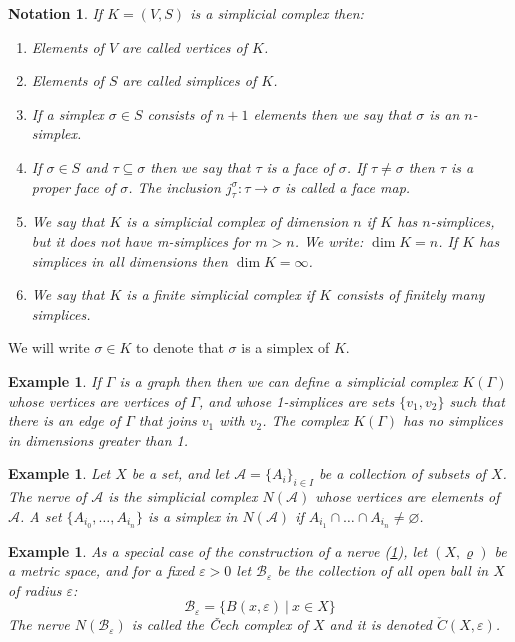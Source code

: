 \documentclass[11pt, letterpaper, oneside]{report}
\theoremstyle{pplain}
\newtheorem{ITERMVALUE THM}[theorem]{Intermediate Value Theorem}
\newtheorem{HEINEBOREL THM}[theorem]{Heine-Borel Theorem}
\newtheorem{UMETR THM}[theorem]{Urysohn Metrization Theorem}
\newtheorem{UMETR2 THM}[theorem]{Urysohn Metrization Theorem (v.2)}
\theoremstyle{ddefinition}
\newtheorem{example}[theorem]{Example}
\newtheorem{notation}[theorem]{Notation}
\theoremstyle{nnn}
\newtheorem{TDA NN}[theorem]{Topological Data Analysis. }
\theoremstyle{eexercise}
\newcommand{\benu}{\begin{enumerate}}
\newcommand{\eenu}{\end{enumerate}}
\begin{document}
\begin{notation}
If $K= (V, S)$ is a simplicial complex then:
\benu[leftmargin = *]
\item[\textbullet] Elements of $V$ are called \emph{vertices} of $K$.
\item[\textbullet] Elements of $S$ are called \emph{simplices} of $K$. 
\item[\textbullet] If  a simplex $\sigma\in S$ consists of $n+1$ elements then 
we say that $\sigma$ is  an \emph{$n$-simplex}. 
\item[\textbullet]  If  $\sigma\in S$  and $\tau\subseteq \sigma$ then we say that 
$\tau$ is a \emph{face} of $\sigma$. If $\tau \neq \sigma$ then $\tau$ is a \emph{proper face} of 
$\sigma$. The inclusion $j^{\sigma}_{\tau}\colon \tau \to \sigma$ is called 
a \emph{face map}.
\item[\textbullet] We say that $K$ is a simplicial complex of dimension $n$ if $K$ has $n$-simplices,
but it does not have m-simplices for $m>n$. We write: $\dim K = n$. If $K$ has simplices in all dimensions 
then $\dim K = \infty$. 
\item[\textbullet]  We say that $K$ is a finite simplicial complex if $K$ consists of finitely many simplices. 
\eenu
\end{notation}


We will write $\sigma \in K$ to denote that $\sigma$ is a simplex of $K$. 


\begin{example}
If $\Gamma$ is a  graph then 
then we can define a simplicial complex $K(\Gamma)$ whose vertices are vertices of $\Gamma$, 
and whose 1-simplices are  sets $\{v_{1}, v_{2}\}$ such that there is an edge  of $\Gamma$ that joins 
$v_{1}$ with $v_{2}$.  The complex $K(\Gamma)$ has no simplices in dimensions greater than 1. 
\end{example}
 

\begin{example}
\label{NERVE EXAMPLE}
Let $X$ be a set, and let $\mathcal{A} = \{A_{i}\}_{i\in I}$ be a collection of subsets of $X$. 
The \emph{nerve} of $\mathcal{A}$ is the simplicial complex $N(\mathcal{A})$ whose  vertices are elements of 
$\mathcal{A}$. A set $\{A_{i_{0}}, \dots, A_{i_{n}}\}$ is a simplex in $N(\mathcal{A})$ if
$A_{i_{1}}\cap {\dots} \cap A_{i_{n}} \neq \varnothing$. 
\end{example}

\begin{example}
\label{CECH COMPLEX EXAMPLE}
As a special case of the construction of a nerve (\ref{NERVE EXAMPLE}), let $(X, \varrho)$ be a metric space,
and for a fixed  $\varepsilon > 0$ let $\mathcal{B}_{\varepsilon}$ be the collection of all open ball in $X$ of radius 
$\varepsilon$: 
$$\mathcal{B}_{\varepsilon} = \{ B(x, \varepsilon) \ | \ x\in X\}$$
The nerve $N(\mathcal{B}_{\varepsilon})$ is called the \emph{\v{C}ech complex} of $X$ and it is  denoted 
$\check{C}(X, \varepsilon)$. 
\end{example}
\end{document}
